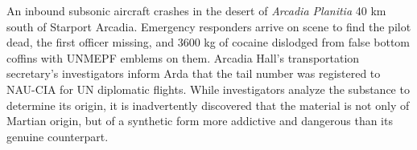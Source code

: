 An inbound subsonic aircraft crashes in the desert of {\it Arcadia Planitia} 40 km south of Starport Arcadia. Emergency responders arrive on scene to find the pilot dead, the first officer missing, and 3600 kg of cocaine dislodged from false bottom coffins with UNMEPF emblems on them. Arcadia Hall's transportation secretary's investigators inform Arda that the tail number was registered to NAU-CIA for UN diplomatic flights. While investigators analyze the substance to determine its origin, it is inadvertently discovered that the material is not only of Martian origin, but of a synthetic form more addictive and dangerous than its genuine counterpart.
\StopTimelineDate

